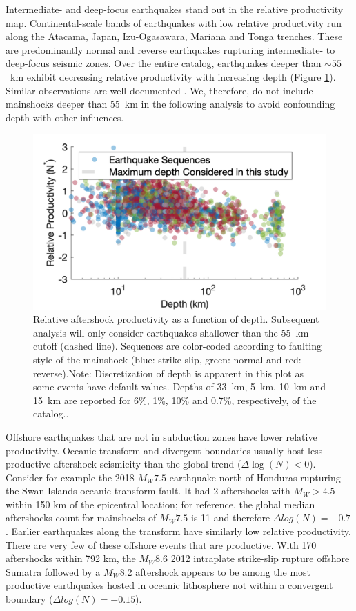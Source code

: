 \documentclass[draft, jgrga]{agujournal2018}
\begin{document}
    Intermediate- and deep-focus earthquakes stand out in the relative productivity map. Continental-scale bands of earthquakes with low relative productivity run along the Atacama, Japan, Izu-Ogasawara, Mariana and Tonga trenches. These are predominantly normal and reverse earthquakes rupturing intermediate- to deep-focus seismic zones. Over the entire catalog, earthquakes deeper than $\sim55$~km exhibit decreasing relative productivity with increasing depth (Figure \ref{fig:prod_vs_depth}). Similar observations are well documented \citep{Bath1965LateralMantle, Frohlich1989TheEarthquakes, Nyffenegger2000, Wiens1997AftershockZone, Wu1999, Houston2004}. We, therefore, do not include mainshocks deeper than 55~km  in the following analysis to avoid confounding depth with other influences.

    \begin{figure}
        \centering
        \includegraphics{prod_vs_depth.png}
        \caption{Relative aftershock productivity as a function of depth. Subsequent analysis will only consider earthquakes shallower than the 55~km cutoff (dashed line). Sequences are color-coded according to faulting style of the mainshock (blue: strike-slip, green: normal and red: reverse).Note: Discretization of depth is apparent in this plot as some events have default values. Depths of  33~km, 5~km, 10~km and 15~km are reported for  6\%, 1\%, 10\% and 0.7\%, respectively, of the catalog..
        }
        \label{fig:prod_vs_depth}
    \end{figure}

    Offshore earthquakes that are not in subduction zones have lower relative productivity. Oceanic transform and divergent boundaries usually host less productive aftershock seismicity than the global trend ($\Delta \log(N)<0$). Consider for example the 2018 $M_W7.5$ earthquake north of Honduras rupturing the Swan Islands oceanic transform fault. It had 2 aftershocks with $M_W>4.5$ within 150 km of the epicentral location; for reference, the global median aftershocks count for mainshocks of $M_W7.5$ is 11 and therefore $\Delta log(N) = -0.7$. Earlier earthquakes along the transform have similarly low relative productivity. There are very few of these offshore events that are productive. With 170 aftershocks within 792 km, the $M_W8.6$ 2012 intraplate strike-slip rupture offshore Sumatra followed by a $M_W8.2$ aftershock appears to be among the most productive earthquakes hosted in oceanic lithosphere not within a convergent boundary ($\Delta log(N) = -0.15$).
\end{document}
